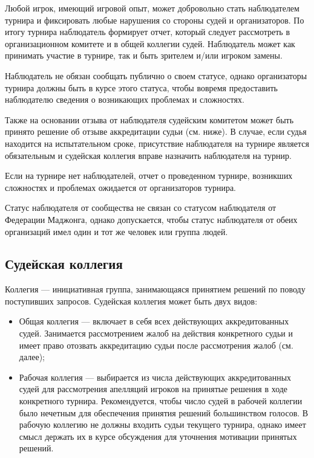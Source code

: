 Любой игрок, имеющий игровой опыт, может добровольно стать наблюдателем турнира и фиксировать любые нарушения со стороны судей и организаторов. По итогу турнира наблюдатель формирует отчет, который следует рассмотреть в организационном комитете и в общей коллегии судей. Наблюдатель может как принимать участие в турнире, так и быть зрителем и/или игроком замены.

Наблюдатель не обязан сообщать публично о своем статусе, однако организаторы турнира должны быть в курсе этого статуса, чтобы вовремя предоставить наблюдателю сведения о возникающих проблемах и сложностях.

Также на основании отзыва от наблюдателя судейским комитетом может быть принято решение об отзыве аккредитации судьи (см. ниже). В случае, если судья находится на испытательном сроке, присутствие наблюдателя на турнире является обязательным и судейская коллегия вправе назначить наблюдателя на турнир.

Если на турнире нет наблюдателей, отчет о проведенном турнире, возникших сложностях и проблемах ожидается от организаторов турнира.

Статус наблюдателя от сообщества не связан со статусом наблюдателя от Федерации Маджонга, однако допускается, чтобы статус наблюдателя от обеих организаций имел один и тот же человек или группа людей.

\subsection{Судейская коллегия}

Коллегия --- инициативная группа, занимающаяся принятием решений по поводу поступивших запросов. Судейская коллегия может быть двух видов:

\begin{itemize}
	\item Общая коллегия --- включает в себя всех действующих аккредитованных судей. Занимается рассмотрением жалоб на действия конкретного судьи и имеет право отозвать аккредитацию судьи после рассмотрения жалоб (см. далее);
	\item Рабочая коллегия --- выбирается из числа действующих аккредитованных судей для рассмотрения апелляций игроков на принятые решения в ходе конкретного турнира. Рекомендуется, чтобы число судей в рабочей коллегии было нечетным для обеспечения принятия решений большинством голосов. В рабочую коллегию не должны входить судьи текущего турнира, однако имеет смысл держать их в курсе обсуждения для уточнения мотивации принятых решений.
\end{itemize}

